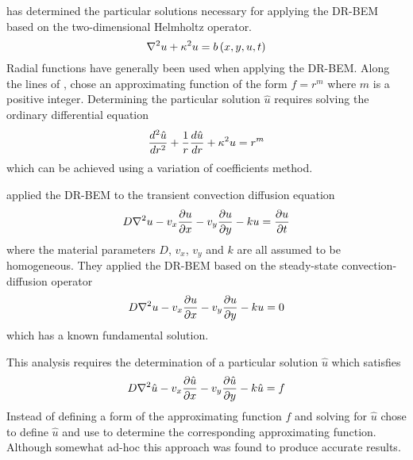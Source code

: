  has determined the particular solutions necessary for
applying the DR-BEM based on the two-dimensional Helmholtz operator.
\begin{equation}
  \nabla^{2} {u} + \kappa^2 u =  b\left( x,y,u,t \right) 
\end{equation}
Radial functions have generally been used when applying the DR-BEM.  Along
the lines of ,  chose an
approximating function of the form $f = r^{m}$ where $m$ is a positive
integer.  Determining the particular solution $\hat{u}$ requires solving the
ordinary differential equation
\begin{equation}
   \dfrac{ d^{2} \hat{u}}{d {r}^{2}}  + \dfrac{1}{r}  \dfrac{ d \hat{u}}{d r}  + \kappa^2 u = r^{m}
\end{equation}
which can be achieved using a variation of coefficients method.

 applied the DR-BEM to the transient convection
diffusion equation
\begin{equation}
  D \nabla^{2} {u} - v_{x}  \dfrac{\partial u}{\partial x}  - v_{y}  \dfrac{\partial u}{\partial y}  - k u =  \dfrac{\partial u}{\partial t} 
\end{equation}
where the material parameters $D$, $v_{x}$, $v_{y}$ and $k$ are all assumed to
be homogeneous.  They applied the DR-BEM based on the steady-state
convection-diffusion operator
\begin{equation}
  D \nabla^{2} {u} - v_{x}  \dfrac{\partial u}{\partial x}  - v_{y}  \dfrac{\partial u}{\partial y}  - k u = 0
\label{eq:steadycd}
\end{equation}
which has a known fundamental solution.

This analysis requires the determination of a particular solution $\hat{u}$
which satisfies
\begin{equation}
  D \nabla^{2} {\hat{u}} - v_{x}  \dfrac{\partial \hat{u}}{\partial x}  - v_{y}  \dfrac{\partial \hat{u}}{\partial y} 
  - k \hat{u} = f
\label{eq:cdpartic}
\end{equation}
Instead of defining a form of the approximating function $f$ and solving
for $\hat{u}$  chose to define $\hat{u}$ and use
 to determine the corresponding approximating function.
Although somewhat ad-hoc this approach was found to produce accurate
results.


